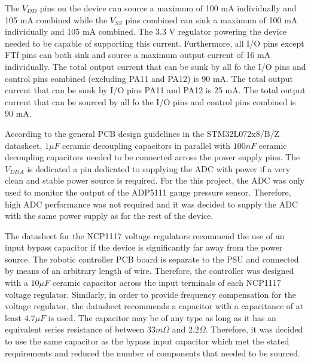 The $V_{DD}$ pins on the device can source a maximum of 100 mA individually and 105 mA combined while the $V_{SS}$ pins combined can sink a maximum of 100 mA individually and 105 mA combined. The 3.3 V regulator powering the device needed to be capable of supporting this current. Furthermore, all I/O pins except FTf pins can both sink and source a maximum output current of 16 mA individually. The total output current that can be sunk by all fo the I/O pins and control pins combined (excluding PA11 and PA12) is 90 mA. The total output current that can be sunk by I/O pins PA11 and PA12 is 25 mA. The total output current that can be sourced by all fo the I/O pins and control pins combined is 90 mA.

According to the general PCB design guidelines in the STM32L072x8/B/Z datasheet, $1\mu F$ ceramic decoupling capacitors in parallel with $100 nF$ ceramic decoupling capacitors needed to be connected across the power supply pins. The $V_{DDA}$ is dedicated a pin dedicated to supplying the ADC with power if a very clean and stable power source is required. For the this project, the ADC was only used to monitor the output of the ADP5111 gauge pressure sensor. Therefore, high ADC performance was not required and it was decided to supply the ADC with the same power supply as for the rest of the device.

The datasheet for the NCP1117 voltage regulators recommend the use of an input bypass capacitor if the device is significantly far away from the power source. The robotic controller PCB board is separate to the PSU and connected by means of an arbitrary length of wire. Therefore, the controller was designed with a $10\mu F$ ceramic 
capacitor across the input terminals of each NCP1117 voltage regulator. Similarly, in order to provide frequency compensation for the voltage regulator, the datasheet recommends a capacitor with a capacitance of at least $4.7\mu F$ is used. The capacitor may be of any type as long as it has an equivalent series resistance of between $33m\Omega$ and $2.2\Omega$. Therefore, it was decided to use the same capacitor as the bypass input capacitor which met the stated requirements and reduced the number of components that needed to be sourced.



